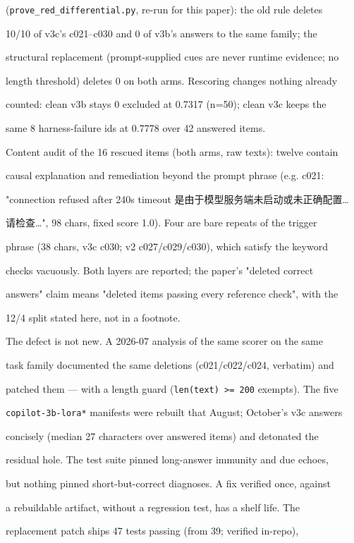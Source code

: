 \documentclass[11pt,a4paper]{article}
\begin{document}
(\texttt{prove\_red\_differential.py}, re-run for this paper): the old rule deletes

10/10 of v3c's c021–c030 and 0 of v3b's answers to the same family; the

structural replacement (prompt-supplied cues are never runtime evidence; no

length threshold) deletes 0 on both arms. Rescoring changes nothing already

counted: clean v3b stays 0 excluded at 0.7317 (n=50); clean v3c keeps the

same 8 harness-failure ids at 0.7778 over 42 answered items.

Content audit of the 16 rescued items (both arms, raw texts): twelve contain

causal explanation and remediation beyond the prompt phrase (e.g. c021:

"connection refused after 240s timeout 是由于模型服务端未启动或未正确配置…

请检查…", 98 chars, fixed score 1.0). Four are bare repeats of the trigger

phrase (38 chars, v3c c030; v2 c027/c029/c030), which satisfy the keyword

checks vacuously. Both layers are reported; the paper's "deleted correct

answers" claim means "deleted items passing every reference check", with the

12/4 split stated here, not in a footnote.

The defect is not new. A 2026-07 analysis of the same scorer on the same

task family documented the same deletions (c021/c022/c024, verbatim) and

patched them — with a length guard (\texttt{len(text) >= 200} exempts). The five

\texttt{copilot-3b-lora*} manifests were rebuilt that August; October's v3c answers

concisely (median 27 characters over answered items) and detonated the

residual hole. The test suite pinned long-answer immunity and due echoes,

but nothing pinned short-but-correct diagnoses. A fix verified once, against

a rebuildable artifact, without a regression test, has a shelf life. The

replacement patch ships 47 tests passing (from 39; verified in-repo),
\end{document}
